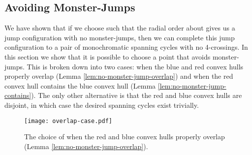 \documentclass[12pt]{article}
\theoremstyle{definition}
\begin{document}
\subsection{Avoiding Monster-Jumps}
We have shown that if we choose  such that the radial order about  gives us a jump configuration with no monster-jumps, then we can complete this jump configuration to a pair of monochromatic spanning cycles with no 4-crossings. In this section we show that it is possible to choose a point  that avoids monster-jumps.
This is broken down into two cases: when the blue and red convex hulls properly overlap (Lemma \ref{lem:no-monster-jump-overlap}) and when the red convex hull contains the blue convex hull (Lemma \ref{lem:no-monster-jump-contains}).
The only other alternative is that the red and blue convex hulls are disjoint, in which case the desired spanning cycles exist trivially.

\begin{figure}
\centering
\texttt{[image: overlap-case.pdf]}
\caption{The choice of  when the red and blue convex hulls properly overlap (Lemma \ref{lem:no-monster-jump-overlap}).}
\label{fig:overlap-case}
\end{figure}
\end{document}
